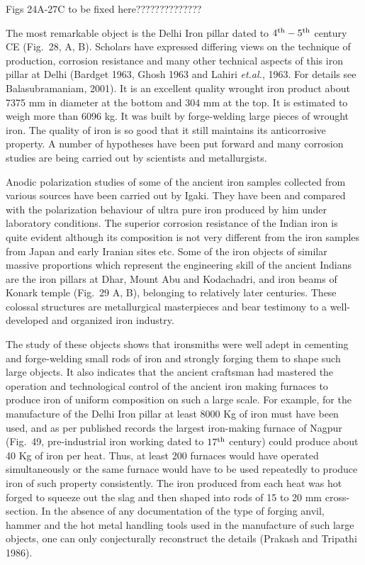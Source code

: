 Figs 24A-27C to be fixed here??????????????


The most remarkable object is the Delhi Iron pillar dated to $4^{\rm th} -5^{\rm th}$ century CE (Fig.~28, A, B). Scholars have expressed differing views on the technique of production, corrosion resistance and many other technical aspects of this iron pillar at Delhi (Bardget 1963, Ghosh 1963 and Lahiri {\it et.al.}, 1963. For details see Balasubramaniam, 2001). It is an excellent quality wrought iron product about 7375 mm in diameter at the bottom and 304 mm at the top. It is estimated to weigh more than 6096 kg. It was built by forge-welding large pieces of wrought iron. The quality of iron is so good that it still maintains its anticorrosive property. A number of hypotheses have been put forward and many corrosion studies are being carried out by scientists and metallurgists. 

Anodic polarization studies of some of the ancient iron samples collected from various sources have been carried out by Igaki. They have been and compared with the polarization behaviour of ultra pure iron produced by him under laboratory conditions. The superior corrosion resistance of the Indian iron is quite evident although its composition is not very different from the iron samples from Japan and early Iranian sites etc. Some of the iron objects of similar massive proportions which represent the engineering skill of the ancient Indians are the iron pillars at Dhar, Mount Abu and Kodachadri, and iron beams of Konark temple (Fig.~29 A, B), belonging to relatively later centuries. These colossal structures are metallurgical masterpieces and bear testimony to a well-developed and organized iron industry.

The study of these objects shows that ironsmiths were well adept in cementing and forge-welding small rods of iron and strongly forging them to shape such large objects. It also indicates that the ancient craftsman had mastered the operation and technological control of the ancient iron making furnaces to produce iron of uniform composition on such a large scale. For example, for the manufacture of the Delhi Iron pillar at least 8000 Kg of iron must have been used, and as per published records the largest iron-making furnace of Nagpur (Fig.~49, pre-industrial iron working dated to $17^{\rm th}$ century) could produce about 40 Kg of iron per heat. Thus, at least 200 furnaces would have operated simultaneously or the same furnace would have to be used repeatedly to produce iron of such property consistently. The iron produced from each heat was hot forged to squeeze out the slag and then shaped into rods of 15 to 20 mm cross-section. In the absence of any documentation of the type of forging anvil, hammer and the hot metal handling tools used in the manufacture of such large objects, one can only conjecturally reconstruct the details (Prakash and Tripathi 1986). 

